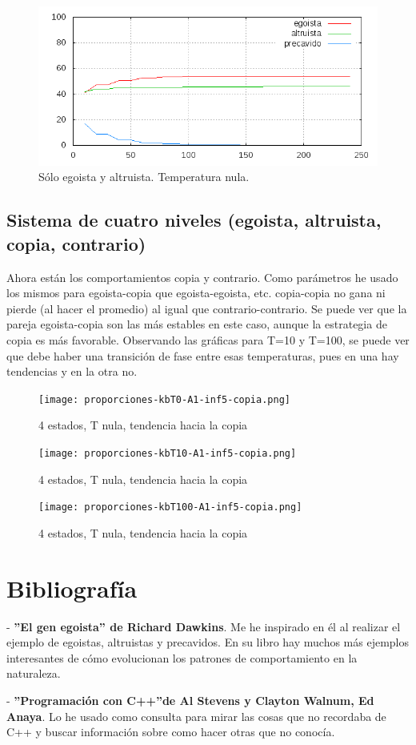 \documentclass[a4paper,10pt,twocolumn]{article}
\begin{document}
\begin{figure}
\includegraphics[scale=0.4]{p-0-1-0-2estados.png}
\caption{S\'olo egoista y altruista. Temperatura nula.}
\end{figure}


\subsection*{Sistema de cuatro niveles (egoista, altruista, copia, contrario)}

Ahora est\'an los comportamientos copia y contrario. Como par\'ametros he usado los mismos para egoista-copia que egoista-egoista, etc. copia-copia no gana ni pierde (al hacer el promedio) al igual que contrario-contrario. Se puede ver que la pareja egoista-copia son las m\'as estables en este caso, aunque la estrategia de copia es m\'as favorable. Observando las gr\'aficas para T=10 y T=100, se puede ver que debe haber una transici\'on de fase entre esas temperaturas, pues en una hay tendencias y en la otra no. 

\begin{figure}
\texttt{[image: proporciones-kbT0-A1-inf5-copia.png]}
\caption{4 estados, T nula, tendencia hacia la copia}
\end{figure}

\begin{figure}
\texttt{[image: proporciones-kbT10-A1-inf5-copia.png]}
\caption{4 estados, T nula, tendencia hacia la copia}
\end{figure}

\begin{figure}
\texttt{[image: proporciones-kbT100-A1-inf5-copia.png]}
\caption{4 estados, T nula, tendencia hacia la copia}
\end{figure}
\newpage
\newpage
\section*{Bibliograf\'ia}
- \textbf{''El gen egoista'' de Richard Dawkins}. Me he inspirado en \'el al realizar el ejemplo de egoistas, altruistas y precavidos. En su libro hay muchos m\'as ejemplos interesantes de c\'omo evolucionan los patrones de comportamiento en la naturaleza.

- \textbf{''Programaci\'on con C++''de  Al Stevens y Clayton Walnum, Ed Anaya}. Lo he usado como consulta para mirar las cosas que no recordaba de C++ y buscar informaci\'on sobre como hacer otras que no conoc\'ia.
\end{document}
